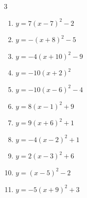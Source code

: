 \begin{multicols}{3}
\begin{enumerate}
\columnbreak %

  \item $\displaystyle y=7\left( x-7\right)^{2}-2$

        \phantom{$\displaystyle 頂点\left( 7 , -2 \right)$}

  \item $\displaystyle y=-\left( x+8\right)^{2}-5$

        \phantom{$\displaystyle 頂点\left( -8 , -5 \right)$}

  \item $\displaystyle y=-4\left( x+10\right)^{2}-9$

        \phantom{$\displaystyle 頂点\left( -10 , -9 \right)$}

  \item $\displaystyle y=-10\left( x+2\right)^{2}$

        \phantom{$\displaystyle 頂点\left( -2 , 0 \right)$}

  \item $\displaystyle y=-10\left( x-6\right)^{2}-4$

        \phantom{$\displaystyle 頂点\left( 6 , -4 \right)$}

  \item $\displaystyle y=8\left( x-1\right)^{2}+9$

        \phantom{$\displaystyle 頂点\left( 1 , 9 \right)$}

  \item $\displaystyle y=9\left( x+6\right)^{2}+1$

        \phantom{$\displaystyle 頂点\left( -6 , 1 \right)$}

  \item $\displaystyle y=-4\left( x-2\right)^{2}+1$

        \phantom{$\displaystyle 頂点\left( 2 , 1 \right)$}

  \item $\displaystyle y=2\left( x-3\right)^{2}+6$

        \phantom{$\displaystyle 頂点\left( 3 , 6 \right)$}

  \item $\displaystyle y=\left( x-5\right)^{2}-2$

        \phantom{$\displaystyle 頂点\left( 5 , -2 \right)$}

  \item $\displaystyle y=-5\left( x+9\right)^{2}+3$

        \phantom{$\displaystyle 頂点\left( -9 , 3 \right)$}


\end{enumerate}
\end{multicols}
